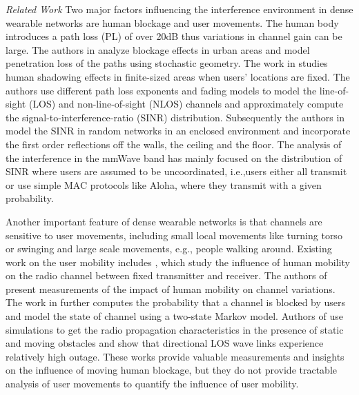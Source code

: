 \documentclass[10pt, conference, letterpaper]{IEEEtran}
\begin{document}
\emph{Related Work}
Two major factors influencing the interference environment in dense wearable networks are human blockage and user movements. The human body introduces a path loss (PL) of over 20dB \cite{humanshadowing} thus variations in channel gain can be large. The authors in \cite{urbanblockage} analyze blockage effects in urban areas and model penetration loss of the paths using stochastic geometry. The work in \cite{interferencefinitesized} studies human shadowing effects in finite-sized areas when users' locations are fixed. The authors use different path loss exponents and fading models to model the line-of-sight (LOS) and non-line-of-sight (NLOS) channels and approximately compute the signal-to-interference-ratio (SINR) distribution. Subsequently the authors in \cite{enclosedmmwave} model the SINR in random networks in an enclosed environment and incorporate the first order reflections off the walls, the ceiling and the floor. The analysis of the interference in the mmWave band has mainly focused on the distribution of SINR where users are assumed to be uncoordinated, i.e.,users  either all transmit or use simple MAC protocols like Aloha, where they transmit with a given probability. 

Another important feature of dense wearable networks is that channels are sensitive to user movements, including small local movements like turning torso or swinging and large scale movements, e.g., people walking around. Existing work on the user mobility includes \cite{humanactivity}\cite{blockagein60ghz}\cite{timevaryingpathshadowing}, which study the influence of human mobility on the radio channel between fixed transmitter and receiver. The authors of \cite{humanactivity}\cite{timevaryingpathshadowing} present measurements of the impact of human mobility on channel variations. The work in \cite{timevaryingpathshadowing} further computes the probability that a channel is blocked by users and model the state of channel using a two-state Markov model. 
Authors of \cite{blockagein60ghz} use simulations to get the radio propagation characteristics in the presence of static and moving obstacles and show that directional LOS wave links experience relatively high outage. These works provide valuable measurements and insights on the influence of moving human blockage, but they do not provide tractable analysis of user movements to quantify the influence of user mobility.
\end{document}
